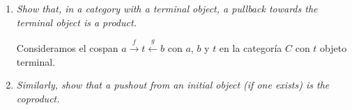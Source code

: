 \documentclass[11pt]{article}
\begin{document}
\begin{enumerate}
\item \textit{Show that, in a category with a terminal object, a pullback towards the terminal object is a product.}

Consideramos el cospan $a \xrightarrow{f} t \xleftarrow{g} b$ con $a$, $b$ y $t$ en la categoría $C$ con $t$ objeto terminal.

\item \textit{Similarly, show that a pushout from an initial object (if one exists) is the coproduct.}
\end{enumerate}
\end{document}

